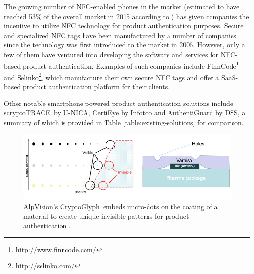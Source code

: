 \documentclass[thesis.tex]{subfiles}
\begin{document}
The growing number of NFC-enabled phones in the market (estimated to have reached 53\% of the overall market in 2015 according to \cite{frost-sullivan}) has given companies the incentive to utilize NFC technology for product authentication purposes. Secure and specialized NFC tags have been manufactured by a number of companies since the technology was first introduced to the market in 2006. However, only a few of them have ventured into developing the software and services for NFC-based product authentication. Examples of such companies include FinnCode\footnote{\url{http://www.finncode.com/}} and Selinko\footnote{\url{http://selinko.com/}}, which manufacture their own secure NFC tags and offer a SaaS-based product authentication platform for their clients.

Other notable smartphone powered product authentication solutions include scryptoTRACE\textregistered\ by U-NICA, CertiEye by Infotoo and AuthentiGuard by DSS, a summary of which is provided in Table \ref{table:existing-solutions} for comparison.
\enlargethispage{1\baselineskip}

\begin{figure}
\centering \includegraphics[width=\textwidth]{images/existing_solutions/cryptoglyph}
\vspace{-8mm}
\caption{AlpVision's CryptoGlyph\textregistered\ embeds micro-dots on the coating of a material to create unique invisible patterns for product authentication \cite{alpvision}. \label{figure:alpvision}}
\vspace{-5mm}
\end{figure}
\end{document}
